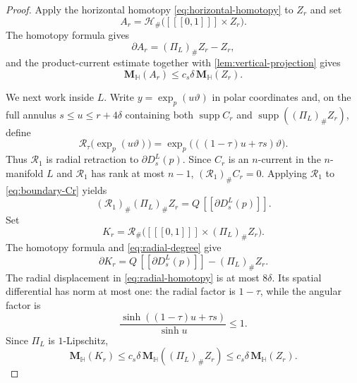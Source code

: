 \documentclass[10pt,a4paper]{amsart}
\newcommand{\Hyp}{\mathbb H}
\newcommand{\Mass}{\mathbf M}
\newcommand{\cur}[1]{\left[\!\left[#1\right]\!\right]}
\newcommand{\supp}{\operatorname{supp}}
\begin{document}
\begin{proof}
Apply the horizontal homotopy \eqref{eq:horizontal-homotopy} to $Z_r$ and
set
\[
 A_r=\mathcal H_\#\bigl(\cur{[0,1]}\times Z_r\bigr).
\]
The homotopy formula gives
\begin{equation}\label{eq:Ar-boundary}
 \partial A_r=(\Pi_L)_\#Z_r-Z_r,
\end{equation}
and the product-current estimate together with
\cref{lem:vertical-projection} gives
\begin{equation}\label{eq:Ar-mass}
 \Mass_{\Hyp}(A_r)\le c_s\delta\,\Mass_{\Hyp}(Z_r).
\end{equation}

We next work inside $L$.  Write
$y=\exp_p(u\vartheta)$ in polar coordinates and, on the full annulus
$s\le u\le r+4\delta$ containing both $\supp C_r$ and
$\supp((\Pi_L)_\#Z_r)$, define
\begin{equation}\label{eq:radial-homotopy}
 \mathcal R_\tau\bigl(\exp_p(u\vartheta)\bigr)
 =\exp_p\bigl(((1-\tau)u+\tau s)\vartheta\bigr).
\end{equation}
Thus $\mathcal R_1$ is radial retraction to $\partial D_s^L(p)$.  Since
$C_r$ is an $n$-current in the $n$-manifold $L$ and
$\mathcal R_1$ has rank at most $n-1$,
$(\mathcal R_1)_\#C_r=0$.  Applying $\mathcal R_1$ to
\eqref{eq:boundary-Cr} yields
\begin{equation}\label{eq:radial-degree}
 (\mathcal R_1)_\#(\Pi_L)_\#Z_r
 =Q\,\cur{\partial D_s^L(p)}.
\end{equation}
Set
\[
 K_r=\mathcal R_\#\bigl(\cur{[0,1]}\times(\Pi_L)_\#Z_r\bigr).
\]
The homotopy formula and \eqref{eq:radial-degree} give
\begin{equation}\label{eq:Kr-boundary}
 \partial K_r=Q\,\cur{\partial D_s^L(p)}-(\Pi_L)_\#Z_r.
\end{equation}
The radial displacement in \eqref{eq:radial-homotopy} is at most
$8\delta$.  Its spatial differential has norm at most one: the radial factor
is $1-\tau$, while the angular factor is
\[
 \frac{\sinh((1-\tau)u+\tau s)}{\sinh u}\le1.
\]
Since $\Pi_L$ is $1$-Lipschitz,
\begin{equation}\label{eq:Kr-mass}
 \Mass_{\Hyp}(K_r)
 \le c_s\delta\,\Mass_{\Hyp}((\Pi_L)_\#Z_r)
 \le c_s\delta\,\Mass_{\Hyp}(Z_r).
\end{equation}


\end{proof}
\end{document}
